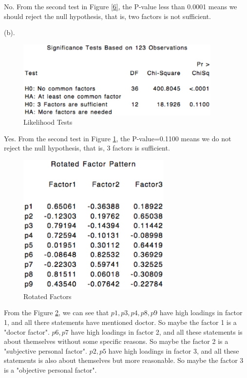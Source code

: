 \documentclass[letterpaper, 12pt]{article}
\begin{document}
No. From the second test in Figure \ref{6}, the P-value less than 0.0001 means we should reject the null hypothesis, that is, two factors is not sufficient.

(b). \begin{figure}[htbp]
\centering\includegraphics[width=4in]{7-7.eps}
\caption{Likelihood Tests}\label{7}
\end{figure}
Yes. From the second test in Figure \ref{7}, the P-value=0.1100 means we do not reject the null hypothesis, that is, 3 factors is sufficient.

\begin{figure}[htbp]
\centering\includegraphics[width=3in]{7-8.eps}
\caption{Rotated Factors}\label{8}
\end{figure}
From the Figure \ref{8}, we can see that $p1,p3,p4,p8,p9$ have high loadings in factor 1, and all there statements have mentioned doctor. So maybe the factor 1 is a "doctor factor". $p6,p7$ have high loadings in factor 2, and all these statements is about themselves without some specific reasons. So maybe the factor 2 is a "subjective personal factor". $p2,p5$ have high loadings in factor 3, and all these statements is also about themselves but more reasonable. So maybe the factor 3 is a "objective personal factor".
\end{document}
